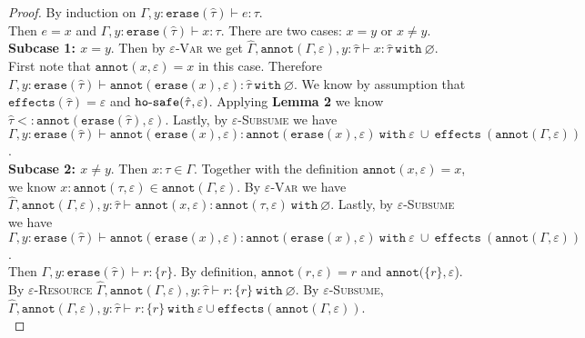 \documentclass{llncs}
\newcommand{\keywadj}[1]{\mathtt{#1}}
\newcommand{\keyw}[1]{\keywadj{#1}~}
\newcommand{\kw}[1]{\keyw{ #1 }}
\newcommand{\kwa}[1]{\keywadj{ #1 }}
\newcommand{\hyphen}{\hbox{-}}
\begin{document}
\begin{proof}
By induction on $\Gamma, y: \kwa{erase}(\hat \tau) \vdash e: \tau$.\\

\noindent
{} Then $e=x$ and $\Gamma, y: \kwa{erase}(\hat \tau) \vdash x: \tau$. There are two cases: $x=y$ or $x \neq y$. \\

\noindent
\textbf{Subcase 1: $x = y$}. Then by \textsc{$\varepsilon$-Var} we get $\hat \Gamma, \kwa{annot}(\Gamma, \varepsilon), y: \hat \tau \vdash x: \hat \tau~\kw{with} \varnothing$. First note that $\kwa{annot}(x, \varepsilon) = x$ in this case. Therefore $\Gamma, y: \kwa{erase}(\hat \tau) \vdash \kwa{annot}(\kwa{erase}(x), \varepsilon): \hat \tau~\kw{with} \varnothing$. We know by assumption that $\kwa{effects}(\hat \tau) = \varepsilon$ and $\kwa{ho \hyphen safe}(\hat \tau, \varepsilon)$. Applying \textbf{Lemma 2} we know $\hat \tau <: \kwa{annot}(\kwa{erase}(\hat \tau), \varepsilon)$. Lastly, by \textsc{$\varepsilon$-Subsume} we have $\Gamma, y: \kwa{erase}(\hat \tau) \vdash \kwa{annot}(\kwa{erase}(x), \varepsilon): \kwa{annot}(\kwa{erase}(x), \varepsilon)~\kw{with} \varepsilon~\cup~\kw{effects}(\kwa{annot}(\Gamma, \varepsilon))$.\\

\noindent
\textbf{Subcase 2: $x \neq y$}. Then $x: \tau \in \Gamma$. Together with the definition $\kwa{annot}(x, \varepsilon) = x$, we know $x: \kwa{annot}(\tau, \varepsilon) \in \kwa{annot}(\Gamma, \varepsilon)$. By \textsc{$\varepsilon$-Var} we have $\hat \Gamma, \kwa{annot}(\Gamma, \varepsilon), y: \hat \tau \vdash \kwa{annot}(x, \varepsilon): \kwa{annot}(\tau, \varepsilon)~\kw{with} \varnothing$. Lastly, by \textsc{$\varepsilon$-Subsume} we have $\Gamma, y: \kwa{erase}(\hat \tau) \vdash \kwa{annot}(\kwa{erase}(x), \varepsilon): \kwa{annot}(\kwa{erase}(x), \varepsilon)~\kw{with} \varepsilon~\cup~\kw{effects}(\kwa{annot}(\Gamma, \varepsilon))$.\\

\noindent
{} Then $\Gamma, y: \kwa{erase}(\hat \tau) \vdash r : \{ r \}$. By definition, $\kwa{annot}(r, \varepsilon) = r$ and $\kwa{annot}(\{ r \}, \varepsilon$). By \textsc{$\varepsilon$-Resource}  $\hat \Gamma, \kwa{annot}(\Gamma, \varepsilon), y: \hat \tau \vdash r: \{ r \}~\kw{with} \varnothing$. By \textsc{$\varepsilon$-Subsume}, $\hat \Gamma, \kwa{annot}(\Gamma, \varepsilon), y: \hat \tau \vdash r: \{ r \}~\kw{with} \varepsilon \cup \kwa{effects}(\kwa{annot}(\Gamma, \varepsilon))$. \\


\end{proof}
\end{document}
